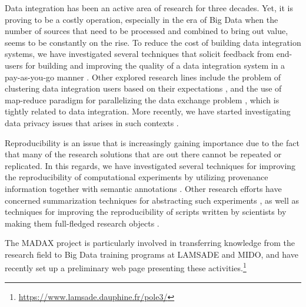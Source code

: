 Data integration has been an active area of research for three decades. Yet, it is proving to be a costly operation, especially in the era of Big Data when the number of sources that need to be processed and combined to bring out value, seems to be constantly on the rise. To reduce the cost of building data integration systems, we have investigated several techniques that solicit feedback from end-users for building and improving the quality of a data integration system in a pay-as-you-go manner \cite{DBLP:conf/ssdbm/RiosPFB16}.  Other explored research lines include the  problem of clustering data integration users based on their expectations \cite{DBLP:journals/dpd/BelhajjamePHF15}, and the use of  map-reduce paradigm for parallelizing the data exchange problem \cite{DBLP:conf/ssdbm/BelhajjameB16}, which is tightly related to data integration. More recently, we have started investigating data privacy issues that arises in such contexts \cite{DBLP:journals/computer/BarhamgiBYBN16}.

Reproducibility is an issue that is increasingly gaining importance due to the fact that many of the research solutions that are out there cannot be repeated or replicated. In this regards, we have investigated several techniques for improving the reproducibility of computational experiments by utilizing provenance information together with semantic annotations \cite{DBLP:journals/ws/Belhajjame0GGHP15,DBLP:conf/eScience/CarvalhoBM16, DBLP:journals/biomedsem/HettneD0WBSMTCVGRCKSHBGR14}. Other research efforts have concerned  summarization techniques for abstracting such experiments \cite{DBLP:conf/ipaw/AlperBGK14}, as well as techniques for improving the reproducibility of scripts written by scientists by making them full-fledged research objects \cite{DBLP:conf/eScience/CarvalhoBM16}.

The MADAX project is particularly involved in transferring knowledge from the research field to Big Data training programs at LAMSADE and MIDO, and have recently set up a preliminary web page presenting these activities.\footnote{\url{https://www.lamsade.dauphine.fr/pole3/}}



